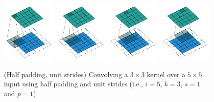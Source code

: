 \begin{figure}[p]
    \centering
    \includegraphics[width=0.24\textwidth]{pdf/same_padding_no_strides_00.pdf}
    \includegraphics[width=0.24\textwidth]{pdf/same_padding_no_strides_01.pdf}
    \includegraphics[width=0.24\textwidth]{pdf/same_padding_no_strides_02.pdf}
    \includegraphics[width=0.24\textwidth]{pdf/same_padding_no_strides_03.pdf}
    \caption{\label{fig:same_padding_no_strides} (Half padding, unit strides)
        Convolving a $3 \times 3$ kernel over a $5 \times 5$ input using half
        padding and unit strides (i.e., $i = 5$, $k = 3$, $s = 1$ and $p = 1$).}
\end{figure}

